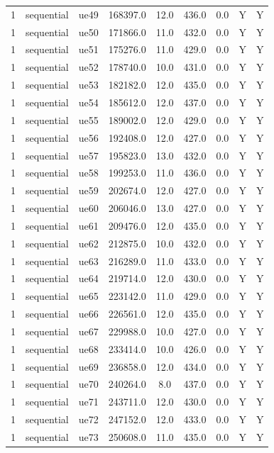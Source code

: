 \begin{table}[ht]
\begin{tabular}{|c|c|c|c|c|c|c|c|c|}
1 & sequential & ue49 & 168397.0 & 12.0 & 436.0 & 0.0 & Y & Y \\
1 & sequential & ue50 & 171866.0 & 11.0 & 432.0 & 0.0 & Y & Y \\
1 & sequential & ue51 & 175276.0 & 11.0 & 429.0 & 0.0 & Y & Y \\
1 & sequential & ue52 & 178740.0 & 10.0 & 431.0 & 0.0 & Y & Y \\
1 & sequential & ue53 & 182182.0 & 12.0 & 435.0 & 0.0 & Y & Y \\
1 & sequential & ue54 & 185612.0 & 12.0 & 437.0 & 0.0 & Y & Y \\
1 & sequential & ue55 & 189002.0 & 12.0 & 429.0 & 0.0 & Y & Y \\
1 & sequential & ue56 & 192408.0 & 12.0 & 427.0 & 0.0 & Y & Y \\
1 & sequential & ue57 & 195823.0 & 13.0 & 432.0 & 0.0 & Y & Y \\
1 & sequential & ue58 & 199253.0 & 11.0 & 436.0 & 0.0 & Y & Y \\
1 & sequential & ue59 & 202674.0 & 12.0 & 427.0 & 0.0 & Y & Y \\
1 & sequential & ue60 & 206046.0 & 13.0 & 427.0 & 0.0 & Y & Y \\
1 & sequential & ue61 & 209476.0 & 12.0 & 435.0 & 0.0 & Y & Y \\
1 & sequential & ue62 & 212875.0 & 10.0 & 432.0 & 0.0 & Y & Y \\
1 & sequential & ue63 & 216289.0 & 11.0 & 433.0 & 0.0 & Y & Y \\
1 & sequential & ue64 & 219714.0 & 12.0 & 430.0 & 0.0 & Y & Y \\
1 & sequential & ue65 & 223142.0 & 11.0 & 429.0 & 0.0 & Y & Y \\
1 & sequential & ue66 & 226561.0 & 12.0 & 435.0 & 0.0 & Y & Y \\
1 & sequential & ue67 & 229988.0 & 10.0 & 427.0 & 0.0 & Y & Y \\
1 & sequential & ue68 & 233414.0 & 10.0 & 426.0 & 0.0 & Y & Y \\
1 & sequential & ue69 & 236858.0 & 12.0 & 434.0 & 0.0 & Y & Y \\
1 & sequential & ue70 & 240264.0 & 8.0 & 437.0 & 0.0 & Y & Y \\
1 & sequential & ue71 & 243711.0 & 12.0 & 430.0 & 0.0 & Y & Y \\
1 & sequential & ue72 & 247152.0 & 12.0 & 433.0 & 0.0 & Y & Y \\
1 & sequential & ue73 & 250608.0 & 11.0 & 435.0 & 0.0 & Y & Y \\

\end{tabular}
\end{table}
